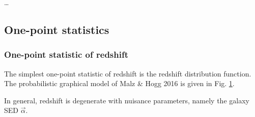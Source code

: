 \documentclass[12pt, onecolumn]{emulateapj}
\begin{document}


\dots

\subsection{One-point statistics}

\subsubsection{One-point statistic of redshift}

The simplest one-point statistic of redshift is the redshift distribution function.  The probabilistic graphical model of Malz \& Hogg 2016 is given in Fig. \ref{fig:nz}. 

\begin{figure}
\vspace{0.5cm}
\begin{center}
\caption{}
\label{fig:nz}
\end{center}
\end{figure}

In general, redshift is degenerate with nuisance parameters, namely the galaxy SED $\vec{\alpha}$.
\end{document}
